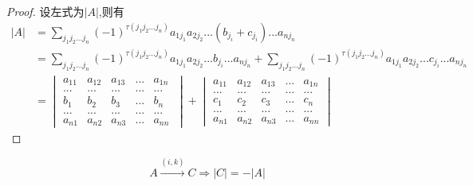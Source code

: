 \documentclass[blue,normal,cn]{elegantnote}
\begin{document}
\begin{proof}

    设左式为$|A|$,则有
    $$
        \begin{aligned}
            |A|&=\sum_{j_1j_2...j_n}(-1)^{\tau(j_1 j_2...j_n)}a_{1 j_1}a_{2 j_2}...(b_{j_i}+c_{j_i})...a_{n j_n}\\
               &=\sum_{j_1j_2...j_n}(-1)^{\tau(j_1 j_2...j_n)}a_{1 j_1}a_{2 j_2}...b_{j_i}...a_{n j_n}+
                 \sum_{j_1j_2...j_n}(-1)^{\tau(j_1 j_2...j_n)}a_{1 j_1}a_{2 j_2}...c_{j_i}...a_{n j_n}\\
               &=
               \begin{vmatrix} 
                a_{11}&a_{12} & a_{13} &...& a_{1n}\\
                ...&...&...&...&...\\
                b_1&b_2 & b_3 &...& b_n\\
                ...&...&...&...&...\\
                a_{n1}&a_{n2} & a_{n3} &...& a_{nn}\
                \end{vmatrix}
                +
                \begin{vmatrix} 
                    a_{11}&a_{12} & a_{13} &...& a_{1n}\\
                    ...&...&...&...&...\\
                    c_1&c_2 & c_3 &...& c_n\\
                    ...&...&...&...&...\\
                    a_{n1}&a_{n2} & a_{n3} &...& a_{nn}
                \end{vmatrix}
        \end{aligned}
    $$
\end{proof}

\begin{property}
    $$
        A\stackrel{(i,k)}{\longrightarrow}C \Rightarrow |C|=-|A|
    $$
\end{property}
\end{document}
